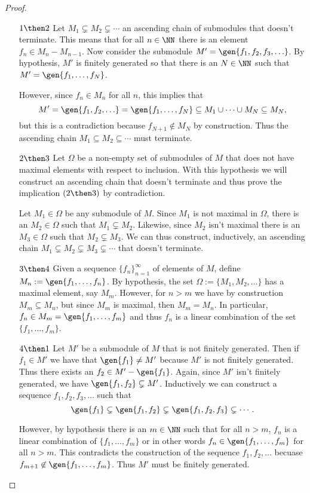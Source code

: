 \begin{proof} $\;$\\
\begin{enumerate}
	\item[$1\then 2$] Let $M_1\subsetneq M_2\subsetneq \cdots$ an ascending chain of submodules that doesn't
		terminate. This means that for all $n\in\NN$ there is an element $f_n\in M_n-M_{n-1}$. Now
		consider the submodule $M'=\gen{f_1,f_2,f_3,\ldots}$. By hypothesis, $M'$ is finitely generated
		so that there is an $N\in\NN$ such that $M'=\gen{f_1,\ldots,f_N}$.

		However, since $f_n\in M_n$ for all $n$, this implies that
		\[
			M'=\gen{f_1,f_2,\ldots}=\gen{f_1,\ldots,f_N}\subseteq M_1\cup\cdots\cup M_N\subseteq M_N,
		\]
		but this is a contradiction because $f_{N+1}\not\in M_{N}$ by construction. Thus the ascending
		chain $M_1\subseteq M_2\subseteq \cdots$ must terminate.

	\item[$2\then 3$] Let $\Omega$ be a non-empty set of submodules of $M$ that does not have maximal
		elements with respect to inclusion. With this hypothesis we will construct an ascending chain
		that doesn't terminate and thus prove the implication $(2\then 3)$ by contradiction.

		Let $M_1\in\Omega$ be any submodule of $M$. Since $M_1$ is not maximal in $\Omega$, there is
		an $M_2\in\Omega$ such that $M_1\subsetneq M_2$. Likewise, since $M_2$ isn't maximal there is
		an $M_3\in\Omega$ such that $M_2\subsetneq M_3$. We can thus construct, inductively, an
		ascending chain $M_1\subsetneq M_2\subsetneq M_3\subsetneq \cdots$ that doesn't terminate.

	\item[$3\then 4$] Given a sequence $\{f_n\}_{n=1}^{\infty}$ of elements of $M$, define $M_n:=\gen{f_1,\ldots,f_n}$.
		By hypothesis, the set $\Omega:=\{M_1,M_2,\ldots\}$ has a maximal element, say $M_m$. However,
		for $n>m$ we have by construction $M_m\subseteq M_n$, but since $M_m$ is maximal, then $M_m=M_n$.
		In particular, $f_n\in M_m=\gen{f_1,\ldots,f_m}$ and thus $f_n$ is a linear combination of the
		set $\{f_1,\ldots,f_m\}$.

	\item[$4\then 1$] Let $M'$ be a submodule of $M$ that is not finitely generated. Then if $f_1\in M'$
		we have that $\gen{f_1}\neq M'$ because $M'$ is not finitely generated. Thus there exists an
		$f_2\in M'-\gen{f_1}$. Again, since $M'$ isn't finitely generated, we have $\gen{f_1,f_2}\subsetneq M'$.
		Inductively we can construct a sequence $f_1,f_2,f_3,\ldots$ such that
		\[
			\gen{f_1}\subsetneq \gen{f_1,f_2} \subsetneq \gen{f_1,f_2,f_3} \subsetneq \cdots.
		\]

		However, by hypothesis there is an $m\in\NN$ such that for all $n>m$, $f_n$ is a linear combination
		of $\{f_1,\ldots,f_m\}$ or in other words $f_n\in\gen{f_1,\ldots,f_m}$ for all $n>m$. This
		contradicts the construction of the sequence $f_1,f_2,\ldots$ becuase $f_{m+1}\not\in\gen{f_1,\ldots,f_m}$.
		Thus $M'$ must be finitely generated.
\end{enumerate}
%
\end{proof}%

